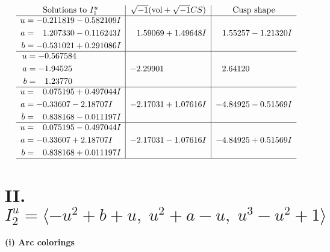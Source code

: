 \documentclass[1p]{elsarticle_modified}
\theoremstyle{definition}
\newcommand{\I}{\sqrt{-1}}
\begin{document}
$$\begin{array}{c|c|c}
\text{Solutions to }I^u_{1}& \I (\text{vol} + \sqrt{-1}CS) & \text{Cusp shape}\\
 \hline 
\begin{aligned}
u &= -0.211819 - 0.582109 I \\
a &= \phantom{-}1.207330 - 0.116243 I \\
b &= -0.531021 + 0.291086 I\end{aligned}
 & \phantom{-}1.59069 + 1.49648 I & \phantom{-}1.55257 - 1.21320 I \\ \hline\begin{aligned}
u &= -0.567584\phantom{ +0.000000I} \\
a &= -1.94525\phantom{ +0.000000I} \\
b &= \phantom{-}1.23770\phantom{ +0.000000I}\end{aligned}
 & -2.29901\phantom{ +0.000000I} & \phantom{-}2.64120\phantom{ +0.000000I} \\ \hline\begin{aligned}
u &= \phantom{-}0.075195 + 0.497044 I \\
a &= -0.33607 - 2.18707 I \\
b &= \phantom{-}0.838168 - 0.011197 I\end{aligned}
 & -2.17031 + 1.07616 I & -4.84925 - 0.51569 I \\ \hline\begin{aligned}
u &= \phantom{-}0.075195 - 0.497044 I \\
a &= -0.33607 + 2.18707 I \\
b &= \phantom{-}0.838168 + 0.011197 I\end{aligned}
 & -2.17031 - 1.07616 I & -4.84925 + 0.51569 I\\
 \hline 
 \end{array}$$\newpage\newpage\renewcommand{\arraystretch}{1}
\centering \section*{II. $I^u_{2}= \langle - u^2+b+u,\;u^2+a- u,\;u^3- u^2+1 \rangle$}
\flushleft \textbf{(i) Arc colorings}\\
\end{document}
